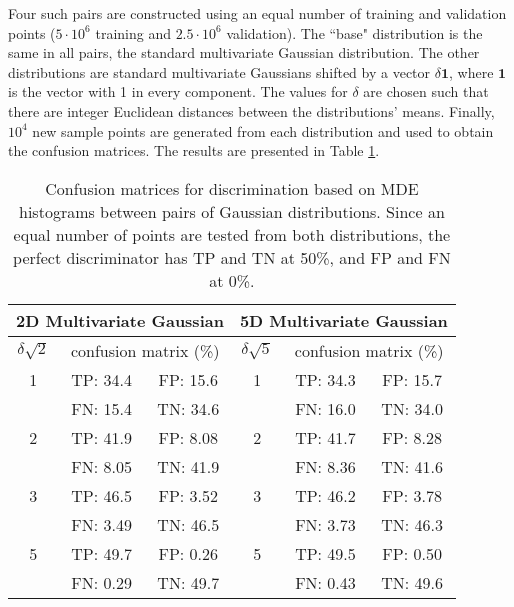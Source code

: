 \documentclass[../scalable-hists.tex]{subfiles}
\begin{document}
  Four such pairs are constructed using an equal number of
  training and validation points
  ($5 \cdot 10^6$ training and $2.5 \cdot 10^6$ validation).
  The ``base" distribution is the same in all pairs,
  the standard multivariate Gaussian distribution.
  The other distributions are standard multivariate Gaussians shifted by a vector $\delta \mathbf 1$,
  where $\mathbf 1$ is the vector with 1 in every component.
  The values for $\delta$ are chosen such that 
  there are integer Euclidean distances between the distributions' means.
  Finally, $10^4$ new sample points are generated from each distribution and used to obtain the confusion matrices.
  The results are presented in Table \ref{tab:conf-mat}.

  \begin{table}
    \centering
    \begin{tabular}{|c|cc||c|cc|}
      \hline
      \multicolumn{3}{|c||}{2D Multivariate Gaussian} & \multicolumn{3}{c|}{5D Multivariate Gaussian} \\
      \hline
      \hline
      $\delta \sqrt 2$ & \multicolumn{2}{c||}{ confusion matrix (\%)} & $\delta \sqrt 5$ & \multicolumn{2}{c|}{ confusion matrix (\%)} \\
      \hline
      1 & TP: 34.4 & FP: 15.6 &
      1 & TP: 34.3 & FP: 15.7 \\
        & FN: 15.4 & TN: 34.6 & 
        & FN: 16.0 & TN: 34.0 \\
      \hline
      2 & TP: 41.9 & FP: 8.08 &
      2 & TP: 41.7 & FP: 8.28 \\
        & FN: 8.05 & TN: 41.9 &
        & FN: 8.36 & TN: 41.6 \\
      \hline
      3 & TP: 46.5 & FP: 3.52 &
      3 & TP: 46.2 & FP: 3.78 \\
        & FN: 3.49 & TN: 46.5 &
        & FN: 3.73 & TN: 46.3 \\
      \hline
      5 & TP: 49.7 & FP: 0.26 &
      5 & TP: 49.5 & FP: 0.50 \\
        & FN: 0.29 & TN: 49.7 &
        & FN: 0.43 & TN: 49.6 \\
      \hline
    \end{tabular}
    \caption{
      Confusion matrices for discrimination based on MDE histograms between pairs of Gaussian distributions.
      Since an equal number of points are tested from both distributions,
      the perfect discriminator has TP and TN at 50\%, and
      FP and FN at 0\%.
    }
    \label{tab:conf-mat}
  \end{table}
\end{document}
